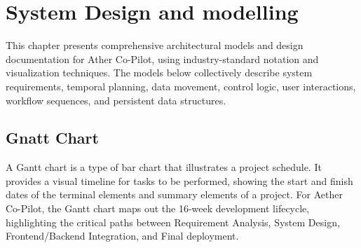 \chapter{System Design and modelling}

This chapter presents comprehensive architectural models and design documentation for Ather Co-Pilot, using industry-standard notation and visualization techniques. The models below collectively describe system requirements, temporal planning, data movement, control logic, user interactions, workflow sequences, and persistent data structures.

\section{Gnatt Chart}
A Gantt chart is a type of bar chart that illustrates a project schedule. It provides a visual timeline for tasks to be performed, showing the start and finish dates of the terminal elements and summary elements of a project. For Aether Co-Pilot, the Gantt chart maps out the 16-week development lifecycle, highlighting the critical paths between Requirement Analysis, System Design, Frontend/Backend Integration, and Final deployment.

